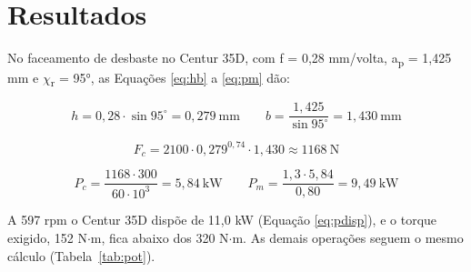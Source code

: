 \section{Resultados}

No faceamento de desbaste no Centur 35D, com f = 0,28 mm/volta, a\textsubscript{p} = 1,425 mm e $\chi$\textsubscript{r} = 95°, as Equações \eqref{eq:hb} a \eqref{eq:pm} dão:

\[
  h = 0,28 \cdot \sin 95^{\circ} = 0,279 \ \text{mm} \qquad b = \frac{1,425}{\sin 95^{\circ}} = 1,430 \ \text{mm}
\]

\[
  F_{c} = 2100 \cdot 0,279^{0,74} \cdot 1,430 \approx 1168 \ \text{N}
\]

\[
  P_{c} = \frac{1168 \cdot 300}{60 \cdot 10^{3}} = 5,84 \ \text{kW} \qquad P_{m} = \frac{1,3 \cdot 5,84}{0,80} = 9,49 \ \text{kW}
\]

A 597 rpm o Centur 35D dispõe de 11,0 kW (Equação \eqref{eq:pdisp}), e o torque exigido, 152 N$\cdot$m, fica abaixo dos 320 N$\cdot$m. As demais operações seguem o mesmo cálculo (Tabela~\ref{tab:pot}).

